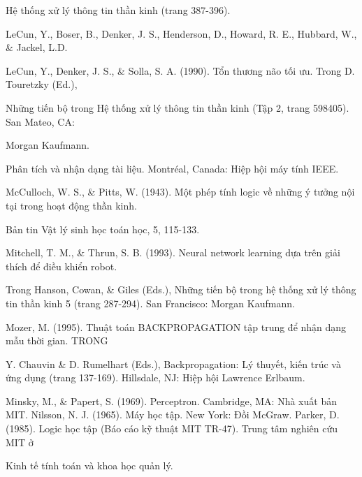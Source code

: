 Hệ thống xử lý thông tin thần kinh (trang 387-396).

LeCun, Y., Boser, B., Denker, J. S., Henderson, D., Howard, R. E., Hubbard, W., \& Jackel, L.D.

LeCun, Y., Denker, J. S., \& Solla, S. A. (1990). Tổn thương não tối ưu. Trong D. Touretzky (Ed.),

Những tiến bộ trong Hệ thống xử lý thông tin thần kinh (Tập 2, trang 598405). San Mateo, CA:

Morgan Kaufmann.

Phân tích và nhận dạng tài liệu. Montréal, Canada: Hiệp hội máy tính IEEE.

McCulloch, W. S., \& Pitts, W. (1943). Một phép tính logic về những ý tưởng nội tại trong hoạt động thần kinh.

Bản tin Vật lý sinh học toán học, 5, 115-133.

Mitchell, T. M., \& Thrun, S. B. (1993). Neural network learning dựa trên giải thích để điều khiển robot.

Trong Hanson, Cowan, \& Giles (Eds.), Những tiến bộ trong hệ thống xử lý thông tin thần kinh 5 (trang 287-294). San Francisco: Morgan Kaufmann.

Mozer, M. (1995). Thuật toán BACKPROPAGATION tập trung để nhận dạng mẫu thời gian. TRONG

Y. Chauvin \& D. Rumelhart (Eds.), Backpropagation: Lý thuyết, kiến ​​trúc và ứng dụng (trang 137-169). Hillsdale, NJ: Hiệp hội Lawrence Erlbaum.

Minsky, M., \& Papert, S. (1969). Perceptron. Cambridge, MA: Nhà xuất bản MIT. Nilsson, N. J. (1965). Máy học tập. New York: Đồi McGraw. Parker, D. (1985). Logic học tập (Báo cáo kỹ thuật MIT TR-47). Trung tâm nghiên cứu MIT ở

Kinh tế tính toán và khoa học quản lý.

